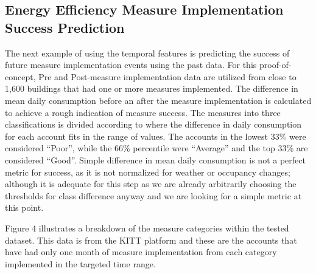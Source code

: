 \subsection{Energy Efficiency Measure Implementation Success Prediction}
\label{sec:measuresuccess}

The next example of using the temporal features is predicting the success of future measure implementation events using the past data. For this proof-of-concept, Pre and Post-measure implementation data are utilized from close to 1,600 buildings that had one or more measures implemented. The difference in mean daily consumption before an after the measure implementation is calculated to achieve a rough indication of measure success. The measures into three classifications is divided according to where the difference in daily consumption for each account fits in the range of values. The accounts in the lowest 33\% were considered “Poor”, while the 66\% percentile were “Average” and the top 33\% are considered “Good”. Simple difference in mean daily consumption is not a perfect metric for success, as it is not normalized for weather or occupancy changes; although it is adequate for this step as we are already arbitrarily choosing the thresholds for class difference anyway and we are looking for a simple metric at this point. 


Figure 4 illustrates a breakdown of the measure categories within the tested dataset. This data is from the KITT platform and these are the accounts that have had only one month of measure implementation from each category implemented in the targeted time range.